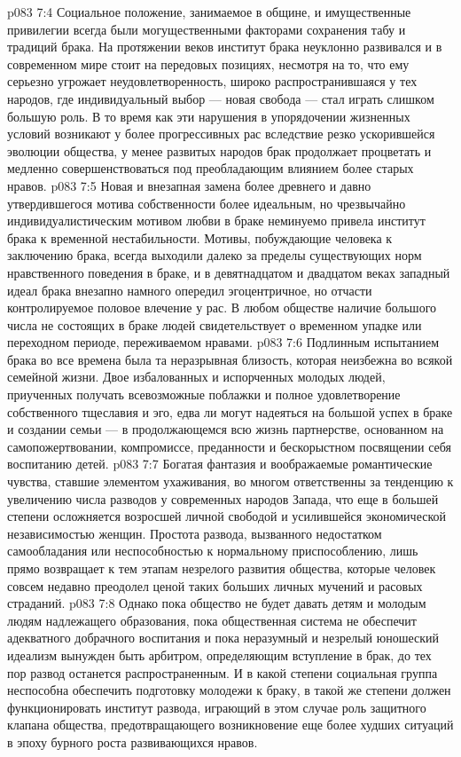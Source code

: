 \vs p083 7:4 Социальное положение, занимаемое в общине, и имущественные привилегии всегда были могущественными факторами сохранения табу и традиций брака. На протяжении веков институт брака неуклонно развивался и в современном мире стоит на передовых позициях, несмотря на то, что ему серьезно угрожает неудовлетворенность, широко распространившаяся у тех народов, где индивидуальный выбор --- новая свобода --- стал играть слишком большую роль. В то время как эти нарушения в упорядочении жизненных условий возникают у более прогрессивных рас вследствие резко ускорившейся эволюции общества, у менее развитых народов брак продолжает процветать и медленно совершенствоваться под преобладающим влиянием более старых нравов.
\vs p083 7:5 Новая и внезапная замена более древнего и давно утвердившегося мотива собственности более идеальным, но чрезвычайно индивидуалистическим мотивом любви в браке неминуемо привела институт брака к временной нестабильности. Мотивы, побуждающие человека к заключению брака, всегда выходили далеко за пределы существующих норм нравственного поведения в браке, и в девятнадцатом и двадцатом веках западный идеал брака внезапно намного опередил эгоцентричное, но отчасти контролируемое половое влечение у рас. В любом обществе наличие большого числа не состоящих в браке людей свидетельствует о временном упадке или переходном периоде, переживаемом нравами.
\vs p083 7:6 Подлинным испытанием брака во все времена была та неразрывная близость, которая неизбежна во всякой семейной жизни. Двое избалованных и испорченных молодых людей, приученных получать всевозможные поблажки и полное удовлетворение собственного тщеславия и эго, едва ли могут надеяться на большой успех в браке и создании семьи --- в продолжающемся всю жизнь партнерстве, основанном на самопожертвовании, компромиссе, преданности и бескорыстном посвящении себя воспитанию детей.
\vs p083 7:7 Богатая фантазия и воображаемые романтические чувства, ставшие элементом ухаживания, во многом ответственны за тенденцию к увеличению числа разводов у современных народов Запада, что еще в большей степени осложняется возросшей личной свободой и усилившейся экономической независимостью женщин. Простота развода, вызванного недостатком самообладания или неспособностью к нормальному приспособлению, лишь прямо возвращает к тем этапам незрелого развития общества, которые человек совсем недавно преодолел ценой таких больших личных мучений и расовых страданий.
\vs p083 7:8 Однако пока общество не будет давать детям и молодым людям надлежащего образования, пока общественная система не обеспечит адекватного добрачного воспитания и пока неразумный и незрелый юношеский идеализм вынужден быть арбитром, определяющим вступление в брак, до тех пор развод останется распространенным. И в какой степени социальная группа неспособна обеспечить подготовку молодежи к браку, в такой же степени должен функционировать институт развода, играющий в этом случае роль защитного клапана общества, предотвращающего возникновение еще более худших ситуаций в эпоху бурного роста развивающихся нравов.
